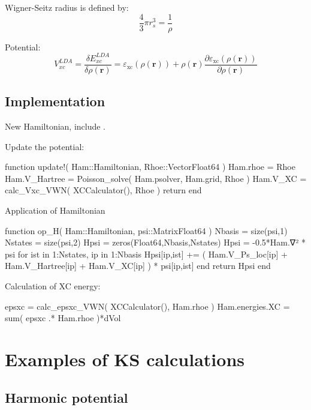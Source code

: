Wigner-Seitz radius is defined by:
\begin{equation}
\frac{4}{3}\pi r^{3}_{s} = \frac{1}{\rho}
\end{equation}

Potential:
\begin{equation}
V^{LDA}_{xc} = \frac{\delta E^{LDA}_{xc}}{\delta \rho(\mathbf{r})} = 
\varepsilon_{\mathrm{xc}}( \rho(\mathbf{r}) ) + \rho(\mathbf{r})
\frac{\partial \varepsilon_{\mathrm{xc}}( \rho(\mathbf{r}) )}{\partial\rho(\mathbf{r})}
\end{equation}


\subsection{Implementation}

New Hamiltonian, include .

Update the potential:

\begin{juliacode}
function update!( Ham::Hamiltonian, Rhoe::Vector{Float64} )
  Ham.rhoe = Rhoe
  Ham.V_Hartree = Poisson_solve( Ham.psolver, Ham.grid, Rhoe )
  Ham.V_XC = calc_Vxc_VWN( XCCalculator(), Rhoe )
  return
end
\end{juliacode}

Application of Hamiltonian
\begin{juliacode}
function op_H( Ham::Hamiltonian, psi::Matrix{Float64} )
  Nbasis = size(psi,1)
  Nstates = size(psi,2)
  Hpsi = zeros(Float64,Nbasis,Nstates)
  Hpsi = -0.5*Ham.∇² * psi
  for ist in 1:Nstates, ip in 1:Nbasis
    Hpsi[ip,ist] += ( Ham.V_Ps_loc[ip] + Ham.V_Hartree[ip] + Ham.V_XC[ip] ) * psi[ip,ist]
  end
  return Hpsi
end
\end{juliacode}

Calculation of XC energy:
\begin{juliacode}
epsxc = calc_epsxc_VWN( XCCalculator(), Ham.rhoe )
Ham.energies.XC = sum( epsxc .* Ham.rhoe )*dVol
\end{juliacode}

\section{Examples of KS calculations}

\subsection{Harmonic potential}

